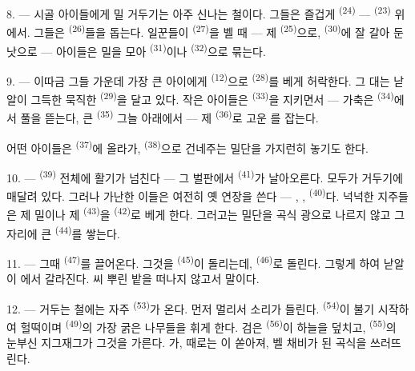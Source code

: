 \VUsaut{5.0mm}
\VUsaut{3.4mm}

8. --- 시골 아이들에게 밀 거두기는 아주 신나는 철이다. 그들은 즐겁게
\textsuperscript{(24)} —  \textsuperscript{(23)} 위에서. 그들은
 \textsuperscript{(26)}들을 돕는다. 일꾼들이 
\textsuperscript{(27)}을 벨 때 — 제  \textsuperscript{(25)}으로,
 \textsuperscript{(30)}에 잘 갈아 둔 낫으로 — 아이들은 밀을 모아
 \textsuperscript{(31)}이나  \textsuperscript{(32)}으로 묶는다.

9. --- 이따금 그들 가운데 가장 큰 아이에게  \textsuperscript{(12)}으로
 \textsuperscript{(28)}를 베게 허락한다. 그 대는 낟알이 그득한 묵직한
 \textsuperscript{(29)}을 달고 있다. 작은 아이들은 
\textsuperscript{(33)}을 지키면서 — 가축은  \textsuperscript{(34)}에서
풀을 뜯는다, 큰  \textsuperscript{(35)} 그늘 아래에서 — 제 
\textsuperscript{(36)}로 고운 를 잡는다.

어떤 아이들은  \textsuperscript{(37)}에 올라가, 
\textsuperscript{(38)}으로 건네주는 밀단을 가지런히 놓기도 한다.

10. ---  \textsuperscript{(39)} 전체에 활기가 넘친다 — 그 벌판에서
 \textsuperscript{(41)}가 날아오른다. 모두가 거두기에 매달려 있다. 그러나
가난한 이들은 여전히 옛 연장을 쓴다 — , , 
\textsuperscript{(40)}다. 넉넉한 지주들은 제 밀이나 제  \textsuperscript{(43)}을
 \textsuperscript{(42)}로 베게 한다. 그러고는 밀단을 곡식 광으로 나르지
않고 그 자리에 큰  \textsuperscript{(44)}를 쌓는다.

11. --- 그때  \textsuperscript{(47)}를 끌어온다. 그것을
 \textsuperscript{(45)}이 돌리는데,  \textsuperscript{(46)}로
돌린다. 그렇게 하여 낟알이 에서 갈라진다. 씨 뿌린 밭을 떠나지 않고서 말이다.

\VUsaut{5.0mm}
\VUsaut{3.4mm}

12. --- 거두는 철에는 자주  \textsuperscript{(53)}가 온다. 먼저 멀리서
 소리가 들린다.  \textsuperscript{(54)}이 불기 시작하여
헐떡이며  \textsuperscript{(49)}의 가장 굵은 나무들을 휘게 한다. 검은
 \textsuperscript{(56)}이 하늘을 덮치고,  \textsuperscript{(55)}의
눈부신 지그재그가 그것을 가른다. 가, 때로는 이 쏟아져, 벨 채비가
된 곡식을 쓰러뜨린다.

